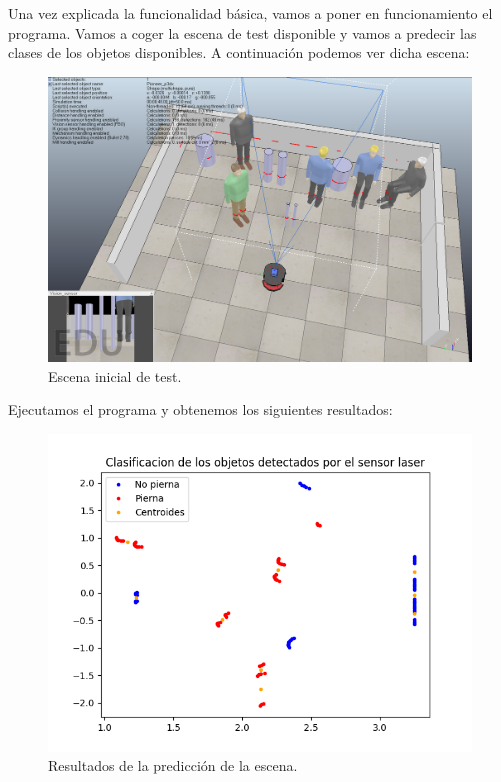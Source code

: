 \documentclass[11pt,a4paper]{article}
\begin{document}
Una vez explicada la funcionalidad básica, vamos a poner en funcionamiento el
programa. Vamos a coger la escena de test disponible y vamos a predecir las
clases de los objetos disponibles. A continuación podemos ver dicha escena:

\begin{figure}[H]
\centering
\includegraphics[scale=0.3]{img/simulador1}
\caption{Escena inicial de test.}
\end{figure}

Ejecutamos el programa y obtenemos los siguientes resultados:

\begin{figure}[H]
\centering
\includegraphics[scale=0.6]{img/pred1-mal}
\caption{Resultados de la predicción de la escena.}
\label{fig:pred1-mal}
\end{figure}
\end{document}
